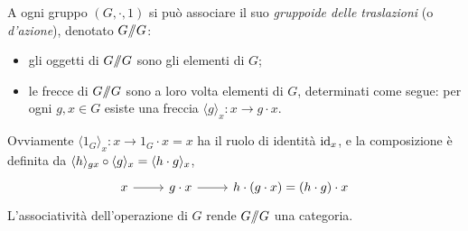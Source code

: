 \begin{example}\label{action_groupoid}
	A ogni gruppo \((G,\cdot,1)\) si può associare il suo \emph{gruppoide delle traslazioni} (o \emph{d'azione}), denotato \(G/\!\!/G\):
	\begin{itemize}
		\item gli oggetti di \(G/\!\!/G\) sono gli elementi di \(G\);
		\item le frecce di \(G/\!\!/G\) sono a loro volta elementi di \(G\), determinati come segue: per ogni \(g,x\in G\) esiste una freccia \(\langle g\rangle_x : x\to g\cdot x\).
	\end{itemize}
	Ovviamente \(\langle 1_G\rangle_x : x \to 1_G\cdot x=x\) ha il ruolo di identità \(\mathrm{id}_x\), e la composizione è definita da \(\langle h\rangle_{gx}\circ \langle g\rangle_x = \langle h\cdot g\rangle_x\),
	\[\begin{tikzcd}
			x \ar[r] & g\cdot x \ar[r] & h\cdot (g\cdot x) = (h\cdot g)\cdot x
		\end{tikzcd}\]
	L'associatività dell'operazione di \(G\) rende \(G/\!\!/G\) una categoria.
	\begin{figure}[h]
		\begin{center}
\end{center}
\end{figure}
\end{example}
